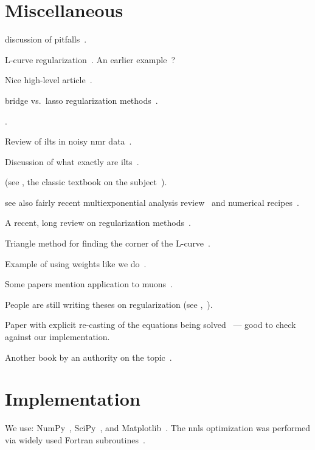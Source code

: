 \section{Miscellaneous \label{sec:miscellaneous}}

discussion of pitfalls~\cite{1983-Varah-SIAMJSSC-4-164}.

L-curve regularization~\cite{1992-Hansen-SIAMR-34-561, 1993-Hansen-SIAMJSC-14-1487}.
An earlier example~\cite{1990-Hansen-SIAMJSSC-11-503}?

Nice high-level article~\cite{1994-Craig-CP-8-648}.

bridge vs.\ lasso regularization methods~\cite{1998-Wenjiang-JCGS-7-397}.

\cite{2002-Venkataramanan-IEEETSP-50-1017}.

Review of \glspl{ilt} in noisy \gls{nmr} data~\cite{2013-Berman-CMRPA-42-72}.

Discussion of what exactly are \glspl{ilt}~\cite{2017-Fordham-DF-29-2}.

(see , the classic textbook on the subject~\cite{1995-Lawson-SLSP}).

see also fairly recent multiexponential analysis review~\cite{1999-Istratov-RSI-70-1233} and numerical recipes~\cite{numerical-recipies}.

A recent, long review on regularization methods~\cite{2018-Benning-AN-27-1}.

Triangle method for finding the corner of the L-curve~\cite{2002-Castellanos-ANM-43-359}.

Example of using weights like we do~\cite{1999-Dunn-JMR-140-153}.

Some papers mention application to muons~\cite{1984-Honig-JCAM-10-113}.

People are still writing theses on regularization (see ,~\cite{2011-OrozcoRodriguez-PhD}).

Paper with explicit re-casting of the equations being solved~\cite{2001-OLeary-SIAMJSC-23-1161} --- good to check against our implementation.

Another book by an authority on the topic~\cite{1998-Hansen-RDDIPP}.

\section{Implementation \label{sec:implementation}}

We use:
NumPy~\cite{2011-vanderWalt-CSE-13-22},
SciPy~\cite{2020-Virtanen-NM},
and Matplotlib~\cite{2007-Hunter-CSE-9-90}.
The \gls{nnls} optimization was performed via widely used Fortran subroutines~\cite{1995-Lawson-SLSP}.

